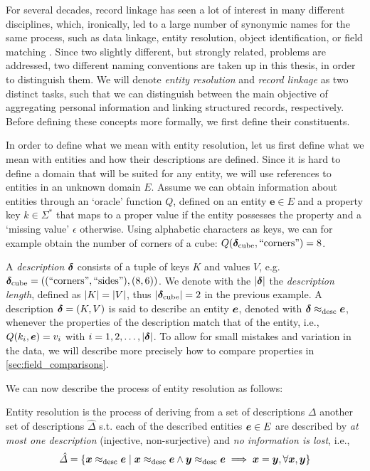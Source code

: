For several decades, record linkage has seen a lot of interest in many different disciplines, which, ironically, led to a large number of synonymic names for the same process, such as data linkage, entity resolution, object identification, or field matching \citep{Christen2012}.
Since two slightly different, but strongly related, problems are addressed, two different naming conventions are taken up in this thesis, in order to distinguish them.
We will denote \emph{entity resolution} and \emph{record linkage} as two distinct tasks, such that we can distinguish between the main objective of aggregating personal information and linking structured records, respectively.
Before defining these concepts more formally, we first define their constituents.

In order to define what we mean with entity resolution, let us first define what we mean with entities and how their descriptions are defined.
Since it is hard to define a domain that will be suited for any entity, we will use references to entities in an unknown domain $E$.
Assume we can obtain information about entities through an `oracle' function $Q$, defined on an entity $\bm{e} \in E$ and a property key $k \in \Sigma^{*}$ that maps to a proper value if the entity possesses the property and a `missing value' $\epsilon$ otherwise.
Using alphabetic characters as keys, we can for example obtain the number of corners of a cube: $Q(\bm{\delta}_\mathrm{cube}, \text{``corners''}) = 8$.

A \emph{description} $\bm\delta$ consists of a tuple of keys $K$ and values $V$,
e.g. $\bm{\delta}_\mathrm{cube}=((\text{``corners''}, \text{``sides''}), (8, 6))$.
We denote with the $\left\vert \bm\delta \right\vert$ the \emph{description length}, defined as $\left\vert K \right\vert=\left\vert V \right\vert$, thus $\left\vert \bm{\delta}_\mathrm{cube} \right\vert=2$ in the previous example.
A description $\bm\delta = (K, V)$ is said to describe an entity $\bm{e}$, denoted with $\bm\delta \approx_\mathrm{desc} \bm{e}$, whenever the properties of the description match that of the entity, i.e., $Q(k_i, \bm{e}) = v_i$ with $i = 1, 2, \dots, \left\vert \bm\delta \right\vert$.
To allow for small mistakes and variation in the data, we will describe more precisely how to compare properties in \cref{sec:field_comparisons}.

We can now describe the process of entity resolution as follows:

\begin{definition}
    Entity resolution is the process of deriving from a set of descriptions $\Delta$ another set of descriptions $\hat{\Delta}$ s.t. each of the described entities $\bm{e} \in E$ are described by \emph{at most one description} (injective, non-surjective) and \emph{no information is lost}, i.e.,
    \begin{equation*}
        \hat{\Delta} = \left\{ \bm{x} \approx_\mathrm{desc} \bm{e} \mid \bm{x} \approx_\mathrm{desc} \bm{e} \wedge \bm{y} \approx_\mathrm{desc} \bm{e} \implies \bm{x} = \bm{y}, \forall \bm{x}, \bm{y} \right\}
    \end{equation*}
\end{definition}

